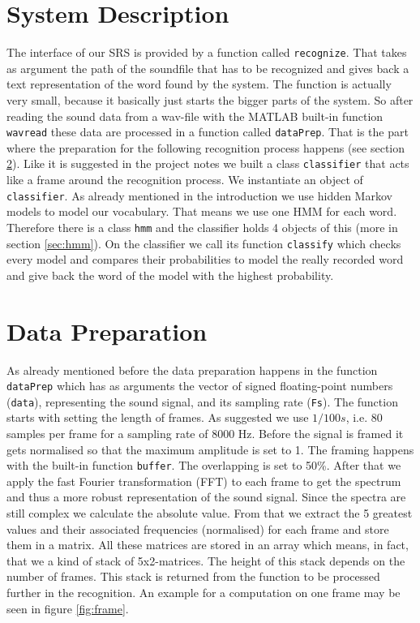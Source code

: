 \documentclass[titlepage]{article}
\begin{document}
\section{System Description}\label{sec:system}
The interface of our SRS is provided by a function called \lstinline&recognize&. That takes as argument the path of the soundfile that has to be recognized and gives back a text representation of the word found by the system. The function is actually very small, because it basically just starts the bigger parts of the system. So after reading the sound data from a wav-file with the MATLAB built-in function \lstinline&wavread& these data are processed in a function called \lstinline&dataPrep&. That is the part where the preparation for the following recognition process happens (see section \ref{sec:prep}).
Like it is suggested in the project notes we built a class \lstinline&classifier& that acts like a frame around the recognition process. We instantiate an object of \lstinline&classifier&. As already mentioned in the introduction we use hidden Markov models to model our vocabulary. That means we use one HMM for each word. Therefore there is a class \lstinline&hmm& and the classifier holds 4 objects of this (more in section \ref{sec:hmm}). On the classifier we call its function \lstinline&classify& which checks every model and compares their probabilities to model the really recorded word and give back the word of the model with the highest probability.


\section{Data Preparation}\label{sec:prep}
As already mentioned before the data preparation happens in the function \lstinline&dataPrep& which has as arguments the vector of signed floating-point numbers (\lstinline&data&), representing the sound signal, and its sampling rate (\lstinline&Fs&). The function starts with setting the length of frames. As suggested we use $1/100 s$, i.e. 80 samples per frame for a sampling rate of 8000 Hz. Before the signal is framed it gets normalised so that the maximum amplitude is set to 1. The framing happens with the built-in function \lstinline&buffer&. The overlapping is set to 50\%. After that we apply the fast Fourier transformation (FFT) to each frame to get the spectrum and thus a more robust representation of the sound signal. Since the spectra are still complex we calculate the absolute value. From that we extract the 5 greatest values and their associated frequencies (normalised) for each frame and store them in a matrix. All these matrices are stored in an array which means, in fact, that we a kind of stack of 5x2-matrices. The height of this stack depends on the number of frames. This stack is returned from the function to be processed further in the recognition. An example for a computation on one frame may be seen in figure \ref{fig:frame}.
\end{document}
